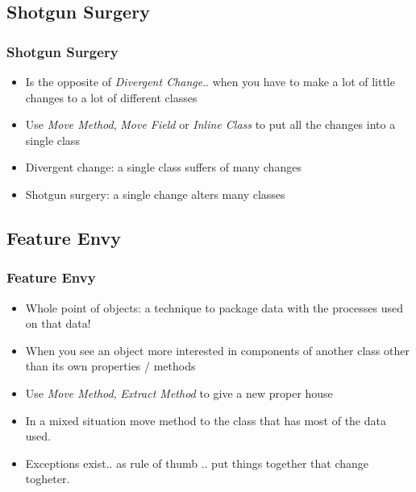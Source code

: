 \documentclass{beamer}
\begin{document}
\subsection{Shotgun Surgery}
\begin{frame}
  \frametitle{Shotgun Surgery}
  \begin{itemize}
	\item<+-> Is the opposite of \textit{Divergent Change}.. when you have to make a lot of little changes to a lot of different classes
	\item<+-> Use \textit{Move Method}, \textit{Move Field} or \textit{Inline Class} to put all the changes into a single class
	\item<+-> Divergent change: a single class suffers of many changes 
	\item<+-> Shotgun surgery: a single change alters many classes
  \end{itemize}
\end{frame}

\subsection{Feature Envy}
\begin{frame}
  \frametitle{Feature Envy}
  \begin{itemize}
	\item<+-> Whole point of objects: a technique to package data with the processes used on that data!
	\item<+-> When you see an object more interested in components of another class other than its own properties / methods
	\item<+-> Use \textit{Move Method}, \textit{Extract Method} to give a new proper house
	\item<+-> In a mixed situation move method to the class that has most of the data used.
	\item<+-> Exceptions exist.. as rule of thumb .. put things together that change togheter.
  \end{itemize}
\end{frame}
\end{document}
